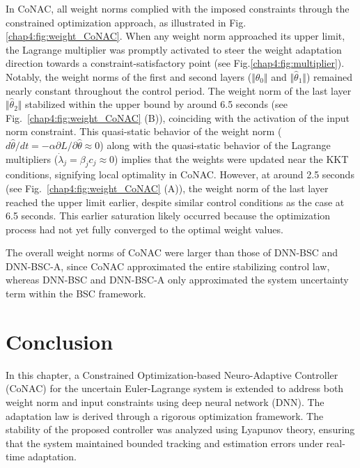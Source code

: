 In CoNAC, all weight norms complied with the imposed constraints through the constrained optimization approach, as illustrated in Fig.\ref{chap4:fig:weight_CoNAC}. When any weight norm approached its upper limit, the Lagrange multiplier was promptly activated to steer the weight adaptation direction towards a constraint-satisfactory point (see Fig.\ref{chap4:fig:multiplier}). Notably, the weight norms of the first and second layers ($\Vert {{{\hat \theta }_0}} \Vert$ and $\Vert {{{\hat \theta }_1}} \Vert$) remained nearly constant throughout the control period. The weight norm of the last layer $\Vert {{{\hat \theta }_2}} \Vert$ stabilized within the upper bound by around 6.5 seconds (see Fig.~\ref{chap4:fig:weight_CoNAC} (B)), coinciding with the activation of the input norm constraint. This quasi-static behavior of the weight norm (\ie $d{\hat\theta}/dt=-\alpha\partial L/\partial \hat\theta \approx 0$) along with the quasi-static behavior of the Lagrange multipliers (\ie $\dot\lambda_j = \beta_j c_j \approx 0$) implies that the weights were updated near the KKT conditions, signifying local optimality in CoNAC. However, at around 2.5 seconds (see Fig.~\ref{chap4:fig:weight_CoNAC} (A)), the weight norm of the last layer reached the upper limit earlier, despite similar control conditions as the case at 6.5 seconds. This earlier saturation likely occurred because the optimization process had not yet fully converged to the optimal weight values.

The overall weight norms of CoNAC were larger than those of DNN-BSC and DNN-BSC-A, since CoNAC approximated the entire stabilizing control law, whereas DNN-BSC and DNN-BSC-A only approximated the system uncertainty term within the BSC framework.

\section{Conclusion} 

In this chapter, a Constrained Optimization-based Neuro-Adaptive Controller \allowbreak (CoNAC) for the uncertain Euler-Lagrange system is extended to address both weight norm and input constraints using deep neural network (DNN).
The adaptation law is derived through a rigorous optimization framework. 
The stability of the proposed controller was analyzed using Lyapunov theory, ensuring that the system maintained bounded tracking and estimation errors under real-time adaptation.

